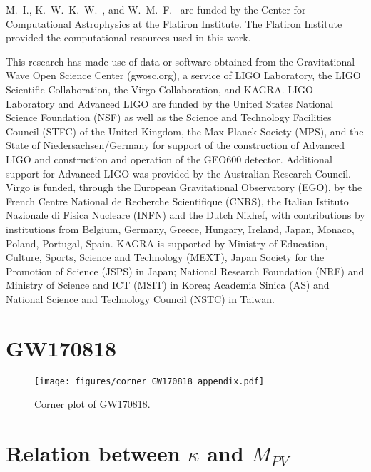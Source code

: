 \documentclass[aps,prd,twocolumn,superscriptaddress,preprintnumbers,floatfix,nofootinbib]{revtex4-2}
\begin{document}
\begin{acknowledgments}
M.~I., K.~W.~K.~W.~, and W.~M.~F.~ are funded by the Center for Computational Astrophysics at the Flatiron Institute.
The Flatiron Institute provided the computational resources used in this work.

This research has made use of data or software obtained from the Gravitational Wave Open Science Center (gwosc.org), a service of LIGO Laboratory, the LIGO Scientific Collaboration, the Virgo Collaboration, and KAGRA.
LIGO Laboratory and Advanced LIGO are funded by the United States National Science Foundation (NSF) as well as the Science and Technology Facilities Council (STFC) of the United Kingdom, the Max-Planck-Society (MPS), and the State of Niedersachsen/Germany for support of the construction of Advanced LIGO and construction and operation of the GEO600 detector.
Additional support for Advanced LIGO was provided by the Australian Research Council.
Virgo is funded, through the European Gravitational Observatory (EGO), by the French Centre National de Recherche Scientifique (CNRS), the Italian Istituto Nazionale di Fisica Nucleare (INFN) and the Dutch Nikhef, with contributions by institutions from Belgium, Germany, Greece, Hungary, Ireland, Japan, Monaco, Poland, Portugal, Spain.
KAGRA is supported by Ministry of Education, Culture, Sports, Science and Technology (MEXT), Japan Society for the Promotion of Science (JSPS) in Japan; National Research Foundation (NRF) and Ministry of Science and ICT (MSIT) in Korea; Academia Sinica (AS) and National Science and Technology Council (NSTC) in Taiwan.
\end{acknowledgments}

\appendix

\section{GW170818}

\begin{figure}
    \texttt{[image: figures/corner\_GW170818\_appendix.pdf]}
    \caption{
        Corner plot of GW170818.
    }
    \label{fig:corner_GW170818_appendix}
\end{figure}

\section{Relation between $\kappa$ and $M_{PV}$}
\label{sec:M_PV_derivation}
\end{document}
